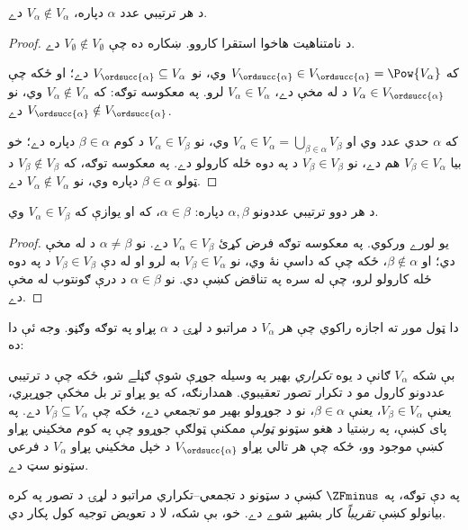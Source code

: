 \documentclass[../../../include/open-logic-section]{subfiles}
\begin{document}
\begin{lem}
د هر ترتيبي عدد $\alpha$ دپاره، $V_\alpha \notin V_\alpha$ دے.
\end{lem}

\begin{proof}
د نامتناهيت هاخوا استقرا کاروو. ښکاره ده چې $V_\emptyset \notin V_\emptyset$ دے.

که $V_{\ordsucc{\alpha}} \in V_{\ordsucc{\alpha}} = \Pow{V_\alpha}$ وي،
نو $V_{\ordsucc{\alpha}} \subseteq V_\alpha$ دے؛ او ځکه چې $V_\alpha
\in V_{\ordsucc{\alpha}}$ د  له مخې دے،
$V_\alpha \in V_\alpha$ لرو. په معکوسه توګه: که $V_\alpha \notin V_\alpha$
وي، نو $V_{\ordsucc{\alpha}} \notin V_{\ordsucc{\alpha}}$ دے.

که $\alpha$ حدي عدد وي او $V_\alpha \in V_\alpha = \bigcup_{\beta \in
\alpha}V_\beta$ وي، نو $V_\alpha \in V_\beta$ د کوم $\beta \in
\alpha$ دپاره دے؛ خو بيا $V_\beta \in V_\alpha$ هم دے، نو $V_\beta \in
V_\beta$ د  په دوه ځله کارولو دے.
په معکوسه توګه، که $V_\beta
\notin V_\beta$ د ټولو $\beta \in \alpha$ دپاره وي، نو $V_\alpha \notin
V_\alpha$ دے.
\end{proof}

\begin{cor}
د هر دوو ترتيبي عددونو $\alpha, \beta$ دپاره: $\alpha \in \beta$، که او يوازې که $V_\alpha \in V_\beta$ وي.
\end{cor}

\begin{proof}
 يو لورے ورکوي. په معکوسه توګه فرض کړئ
$V_\alpha \in V_\beta$ دے. نو $\alpha \neq \beta$ د 
له مخې دي؛ او $\beta \notin \alpha$، ځکه چې که داسې نۀ وي، نو
$V_\beta \in V_\alpha$ به لرو او له دې $V_\beta \in V_\beta$ د
 په دوه ځله کارولو لرو، چې له
 سره په تناقض کښې دي. نو $\alpha \in \beta$ د درې ګونتوب له مخې دے.
\end{proof}
\noindent
دا ټول موږ ته اجازه راکوي چې هر $V_\alpha$ د مراتبو د لړۍ د $\alpha$
پړاو په توګه وګڼو. وجه ئې دا ده:

بې شکه $V_\alpha$ ګانې د يوه \emph{تکراري} بهير په وسيله جوړې شوې
ګڼلے شو، ځکه چې د ترتيبي عددونو کارول مو د تکرار تصور تعقيبوي.
همدارنګه، که يو پړاو تر بل مخکې جوړېږي، يعنې
$V_\beta \in V_\alpha$، يعنې $\beta \in \alpha$، نو د جوړولو بهير مو
\emph{تجمعي} دے، ځکه چې $V_\beta \subseteq V_\alpha$ دے.
په پای کښې، په رښتيا د هغو سټونو \emph{ټولې} ممکنې ټولګې جوړوو چې
په کوم مخکيني پړاو کښې موجود وو، ځکه چې هر تالي پړاو
$V_{\ordsucc{\alpha}}$ د خپل مخکيني پړاو $V_\alpha$ د فرعي سټونو سټ دے.

په دې توګه، په $\ZFminus$ کښې د سټونو د تجمعي--تکراري مراتبو د لړۍ
د تصور په کره بيانولو کښې \emph{تقريباً} کار بشپړ شوے دے.
خو، بې شکه، لا د تعويض توجيه کول پکار دي.
\end{document}
